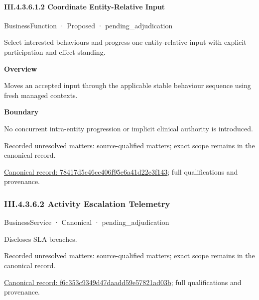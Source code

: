 \paragraph*{III.4.3.6.1.2 Coordinate Entity-Relative Input}
\label{navigation:III.4.3.6.1.2}

\label{element:78417d5c46cc406f95e6a41d22e3f143}
{\small BusinessFunction · Proposed · pending\_adjudication}\par

Select interested behaviours and progress one entity-relative input with explicit participation and effect standing.



\textbf{Overview}



Moves an accepted input through the applicable stable behaviour sequence using fresh managed contexts.



\textbf{Boundary}



No concurrent intra-entity progression or implicit clinical authority is introduced.


{\small Recorded unresolved matters: source-qualified matters; exact scope remains in the canonical record.}\par
{\footnotesize \href{../../../../../../../../continuum/business/business-function/78417d5c46cc406f95e6a41d22e3f143.md}{Canonical record: 78417d5c46cc406f95e6a41d22e3f143}; full qualifications and provenance.}\par
\subsubsection*{III.4.3.6.2 Activity Escalation Telemetry}
\label{navigation:III.4.3.6.2}

\label{element:f6c353c9349d47daadd59e57821ad03b}
{\small BusinessService · Canonical · pending\_adjudication}\par

Discloses SLA breaches.


{\small Recorded unresolved matters: source-qualified matters; exact scope remains in the canonical record.}\par
{\footnotesize \href{../../../../../../../../continuum/business/business-service/f6c353c9349d47daadd59e57821ad03b.md}{Canonical record: f6c353c9349d47daadd59e57821ad03b}; full qualifications and provenance.}\par
